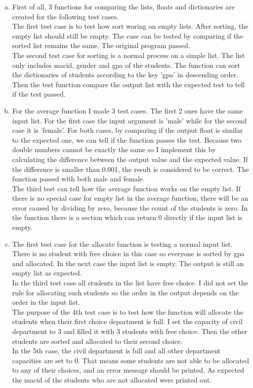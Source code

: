 \documentclass[12pt]{article}
\begin{document}
\begin{enumerate}[(a)]

\item First of all, 3 functions for comparing the lists, floats and dictionaries are created for the following test cases.\\
The first test case is to test how sort woring on empty lists. After sorting, the empty list should still be empty. The case can be tested by comparing if the sorted list remains the same. The original program passed.\\
The second test case for sorting is a normal process on a simple list. The list only includes macid, gender and gpa of the students. The function can sort the dictionaries of students according to the key 'gpa' in descending order. Then the test function compare the output list with the expected test to tell if the test passed.\\
\item For the average function I made 3 test cases. The first 2 ones have the same input list. For the first case the input argument is 'male' while for the second case it is 'female'. For both cases, by comparing if the output float is similar to the expected one, we can tell if the function passes the test. Because two double numbers cannot be exactly the same so I implement this by calculating the difference between the output value and the expected value. If the difference is smaller than 0.001, the result is considered to be correct. The function passed with both male and female.\\
The third test can tell how the average function works on the empty list. If there is no special case for empty list in the average function, there will be an error caused by dividing by zero, because the count of the students is zero. In the function there is a section which can return 0 directly if the input list is empty.\\
\item The first test case for the allocate function is testing a normal input list. There is no student with free choice in this case so everyone is sorted by gpa and allocated. In the next case the input list is empty. The output is still an empty list as expected.\\
In the third test case all students in the list have free choice. I did not set the rule for allocating such students so the order in the output depends on the order in the input list.\\
The purpose of the 4th test case is to test how the function will allocate the students when their first choice department is full. I set the capacity of civil department to 3 and filled it with 3 students with free choice. Then the other students are sorted and allocated to their second choice.\\
In the 5th case, the civil department is full and all other department capacities are set to 0. That means some students are not able to be allocated to any of their choices, and an error message should be printed. As expected the macid of the students who are not allocated were printed out.\\

\end{enumerate}
\end{document}
